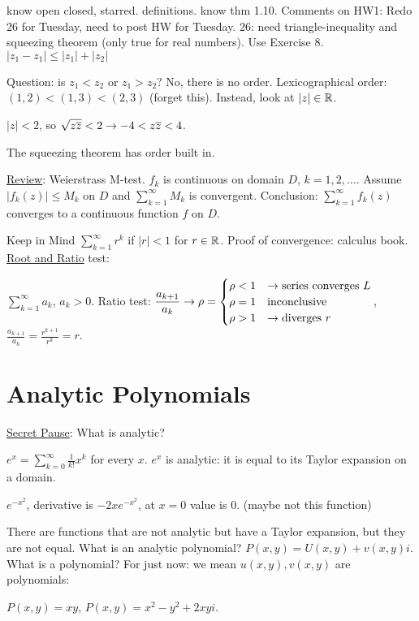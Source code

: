 \documentclass[]{article}
\begin{document}
know open closed, starred. definitions. know thm 1.10.
Comments on HW1: Redo 26 for Tuesday, need to post HW for Tuesday. 26: need triangle-inequality and squeezing theorem (only true for real numbers). Use Exercise 8. $| z_1 - z_1 | \leq |z_1| + |z_2|$

Question: is $z_1<z_2$ or $z_1>z_2$? No, there is no order.
Lexicographical order: $(1,2)<(1,3)<(2,3)$ (forget this).
Instead, look at $|z|\in\mathbb{R}$.

\begin{example}
	$|z|<2$, so $\sqrt{z\overline{z}}<2 \rightarrow -4<z\overline{z}<4$.
\end{example}

The squeezing theorem has order built in.

\underline{Review}: Weierstrass M-test.
$f_k$ is continuous on domain $D$, $k=1,2,\dots$. Assume $|f_k(z)|\leq M_k$ on $D$ and $\sum_{k=1}^\infty M_k$ is convergent. Conclusion: $\sum_{k=1}^\infty f_k(z)$ converges to a continuous function $f$ on $D$.

Keep in Mind $\sum_{k=1}^\infty r^k$ if $|r|<1$ for $r\in \mathbb{R}$. Proof of convergence: calculus book. \underline{Root and Ratio} test: 

$\displaystyle \sum_{k=1}^\infty a_k$, $a_k>0$.
Ratio test:
$\displaystyle \frac{a_{k+1}}{a_k} \rightarrow \rho = \begin{cases} \rho <1 & \rightarrow \text{series converges }L \\ \rho=1 & \text{inconclusive} \\ \rho > 1 & \rightarrow \text{diverges }r\end{cases}$, $\displaystyle \frac{a_{k+1}}{a_k} = \frac{r^{k+1}}{r^k} = r$.

\section{Analytic Polynomials}
\underline{Secret Pause}: What is analytic?
\begin{example}
	$e^x = \sum_{k=0}^\infty \frac{1}{k!}x^k$ for every $x$. $e^x$ is analytic: it is equal to its Taylor expansion on a domain.
\end{example}
\begin{example}
	$e^{-x^2}$, derivative is $-2xe^{-x^2}$, at $x=0$ value is 0. (maybe not this function)
\end{example}

There are functions that are not analytic but have a Taylor expansion, but they are not equal.
What is an analytic polynomial? $P(x,y) = U(x,y) + v(x,y)i$.
What is a polynomial? For just now: we mean $u(x,y),v(x,y)$ are polynomials:
\begin{example}
	$P(x,y)=xy$, $P(x,y) = x^2-y^2+2xyi$.
\end{example}
\end{document}
